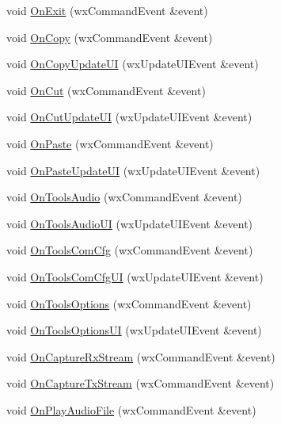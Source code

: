 \begin{DoxyCompactItemize}
void \hyperlink{class_main_frame_af1146ec5200a7421957b143782bca765}{On\-Exit} (wx\-Command\-Event \&event)
\item 
void \hyperlink{class_main_frame_a8097107697fc7fa693ab55aa7ea71a8b}{On\-Copy} (wx\-Command\-Event \&event)
\item 
void \hyperlink{class_main_frame_a1359735d6cce965dfcaa161cee9e8df8}{On\-Copy\-Update\-U\-I} (wx\-Update\-U\-I\-Event \&event)
\item 
void \hyperlink{class_main_frame_aeb57051751eb8390a8305766620ca253}{On\-Cut} (wx\-Command\-Event \&event)
\item 
void \hyperlink{class_main_frame_ae9222bb34fe54e65f32e9dcde9315d2d}{On\-Cut\-Update\-U\-I} (wx\-Update\-U\-I\-Event \&event)
\item 
void \hyperlink{class_main_frame_af6e53b7f644155f5235a8dfc940ea885}{On\-Paste} (wx\-Command\-Event \&event)
\item 
void \hyperlink{class_main_frame_a096dd35dab302c41ba1d97c21cda5026}{On\-Paste\-Update\-U\-I} (wx\-Update\-U\-I\-Event \&event)
\item 
void \hyperlink{class_main_frame_a82a92e9b1ea9ffdd26badd5b74ee254d}{On\-Tools\-Audio} (wx\-Command\-Event \&event)
\item 
void \hyperlink{class_main_frame_abecf4d16789e14b0f42177a939eb07f4}{On\-Tools\-Audio\-U\-I} (wx\-Update\-U\-I\-Event \&event)
\item 
void \hyperlink{class_main_frame_a560029fb1c277c79bd932c047ec9effd}{On\-Tools\-Com\-Cfg} (wx\-Command\-Event \&event)
\item 
void \hyperlink{class_main_frame_acd3cdef97be73dd70187f21016eeb1cb}{On\-Tools\-Com\-Cfg\-U\-I} (wx\-Update\-U\-I\-Event \&event)
\item 
void \hyperlink{class_main_frame_a82b97e0f3c4e530d5700b2c2dbac42bf}{On\-Tools\-Options} (wx\-Command\-Event \&event)
\item 
void \hyperlink{class_main_frame_ac7ceb1e047f2f3b0c26c0b42a110fe99}{On\-Tools\-Options\-U\-I} (wx\-Update\-U\-I\-Event \&event)
\item 
void \hyperlink{class_main_frame_a29cacc38a66c9e000f7f512ebf14473b}{On\-Capture\-Rx\-Stream} (wx\-Command\-Event \&event)
\item 
void \hyperlink{class_main_frame_ac4bb829b48fa6e931098436e87c5fd8c}{On\-Capture\-Tx\-Stream} (wx\-Command\-Event \&event)
\item 
void \hyperlink{class_main_frame_ae0c35052e6bb6642ebbbe5c8de7be68e}{On\-Play\-Audio\-File} (wx\-Command\-Event \&event)

\end{DoxyCompactItemize}
